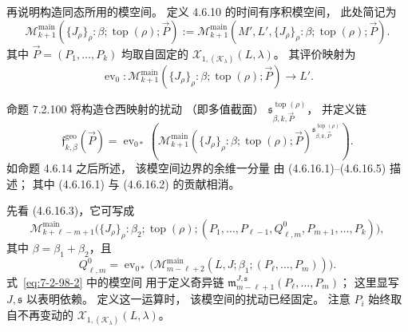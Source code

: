 再说明构造同态所用的模空间。
定义 4.6.10 的时间有序积模空间，
此处简记为
\[
\mathcal M^{\mathrm{main}}_{k+1}
(\{J_\rho\}_\rho:\beta;\operatorname{top}(\rho);\vec P)
:=\mathcal M^{\mathrm{main}}_{k+1}
(M',L',\{J_\rho\}_\rho:\beta;\operatorname{top}(\rho);\vec P).
\]
其中 $\vec P=(P_1,\ldots,P_k)$
均取自固定的
$\mathcal X_{1,(\mathcal K_\lambda)}(L,\lambda)$。
其评价映射为
\begin{equation}
\operatorname{ev}_0\colon
\mathcal M^{\mathrm{main}}_{k+1}
(\{J_\rho\}_\rho:\beta;
\operatorname{top}(\rho);\vec P)
\longrightarrow L'.
\tag{7.2.97}\label{eq:7-2-97}
\end{equation}

命题 7.2.100 将构造仓西映射的扰动
（即多值截面）
$\mathfrak s^{\operatorname{top}(\rho)}_{\beta,k,\vec P}$，
并定义链
\[
\mathfrak f^{\mathrm{geo}}_{k,\beta}(\vec P)
=\operatorname{ev}_{0*}\left(
\mathcal M^{\mathrm{main}}_{k+1}
(\{J_\rho\}_\rho:\beta;
\operatorname{top}(\rho);\vec P)
^{\mathfrak s^{\operatorname{top}(\rho)}_{\beta,k,\vec P}}
\right).
\]
如命题 4.6.14 之后所述，
该模空间边界的余维一分量
由 (4.6.16.1)--(4.6.16.5) 描述；
其中 (4.6.16.1) 与 (4.6.16.2)
的贡献相消。

先看 (4.6.16.3)，它可写成
\begin{equation}
\mathcal M^{\mathrm{main}}_{k+\ell-m+1}
\bigl(\{J_\rho\}_\rho:\beta_2;
\operatorname{top}(\rho);
(P_1,\ldots,P_{\ell-1},Q^0_{\ell,m},
P_{m+1},\ldots,P_k)\bigr),
\tag{7.2.98.1}\label{eq:7-2-98-1}
\end{equation}
其中 $\beta=\beta_1+\beta_2$，且
\begin{equation}
Q^0_{\ell,m}
=\operatorname{ev}_{0*}\bigl(
\mathcal M^{\mathrm{main}}_{m-\ell+2}
(L,J;\beta_1;(P_\ell,\ldots,P_m))\bigr).
\tag{7.2.98.2}\label{eq:7-2-98-2}
\end{equation}
式~\eqref{eq:7-2-98-2} 中的模空间
用于定义奇异链
$\mathfrak m^{J,\mathfrak s}_{m-\ell+1}
(P_\ell,\ldots,P_m)$；
这里显写 $J,\mathfrak s$ 以表明依赖。
定义这一运算时，
该模空间的扰动已经固定。
注意 $P_i$ 始终取自不再变动的
$\mathcal X_{1,(\mathcal K_\lambda)}(L,\lambda)$。


